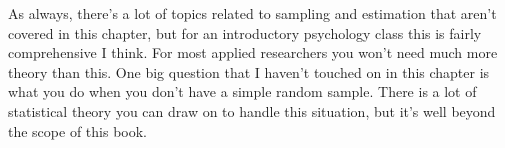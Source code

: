 \noindent
As always, there's a lot of topics related to sampling and estimation that aren't covered in this chapter, but for an introductory psychology class this is fairly comprehensive I think. For most applied researchers you won't need much more theory than this. One big question that I haven't touched on in this chapter is what you do when you don't have a simple random sample. There is a lot of statistical theory you can draw on to handle this situation, but it's well beyond the scope of this book.

